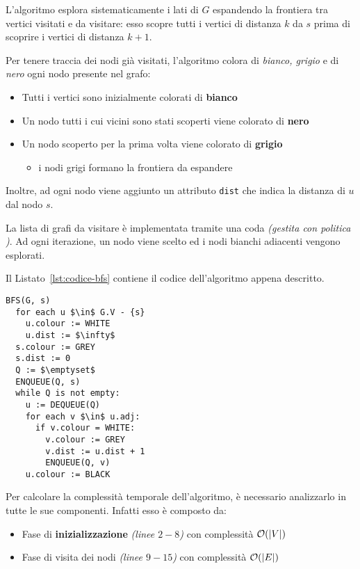 \documentclass[italian, 10pt]{article}
\begin{document}
L'algoritmo \BFS esplora sistematicamente i lati di \(G\) espandendo la frontiera tra vertici visitati e da visitare: esso scopre tutti i vertici di distanza \(k\) da \(s\) prima di scoprire i vertici di distanza \(k+1\).

Per tenere traccia dei nodi già visitati, l'algoritmo colora di \textit{bianco, grigio} e di \textit{nero} ogni nodo presente nel grafo:

\begin{itemize}
  \item Tutti i vertici sono inizialmente colorati di \textbf{bianco}
  \item Un nodo tutti i cui vicini sono stati scoperti viene colorato di \textbf{nero}
  \item Un nodo scoperto per la prima volta viene colorato di \textbf{grigio}
        \begin{itemize}
          \item i nodi grigi formano la frontiera da espandere
        \end{itemize}
\end{itemize}

Inoltre, ad ogni nodo viene aggiunto un attributo \texttt{dist} che indica la distanza di \(u\) dal nodo \(s\).

La lista di grafi da visitare è implementata tramite una coda \textit{(gestita con politica \FIFO)}.
Ad ogni iterazione, un nodo viene scelto ed i nodi bianchi adiacenti vengono esplorati.

\bigskip
Il Listato~\ref{lst:codice-bfs} contiene il codice dell'algoritmo appena descritto.

\begin{lstlisting}[style=pseudocode, caption={Algoritmo \texttt{BFS}}, label={lst:codice-bfs}]
BFS(G, s)
  for each u $\in$ G.V - {s}
    u.colour := WHITE
    u.dist := $\infty$
  s.colour := GREY
  s.dist := 0
  Q := $\emptyset$
  ENQUEUE(Q, s)
  while Q is not empty:
    u := DEQUEUE(Q)
    for each v $\in$ u.adj:
      if v.colour = WHITE:
        v.colour := GREY
        v.dist := u.dist + 1
        ENQUEUE(Q, v)
    u.colour := BLACK
\end{lstlisting}

Per calcolare la complessità temporale dell'algoritmo, è necessario analizzarlo in tutte le sue componenti.
Infatti esso è composto da:

\begin{itemize}
  \item Fase di \textbf{inizializzazione} \textit{(linee \(2-8\))} con complessità \(\mathcal{O}(|V|)\)
  \item Fase di visita dei nodi \textit{(linee \(9-15\))} con complessità \(\mathcal{O}(|E|)\)
\end{itemize}
\end{document}
